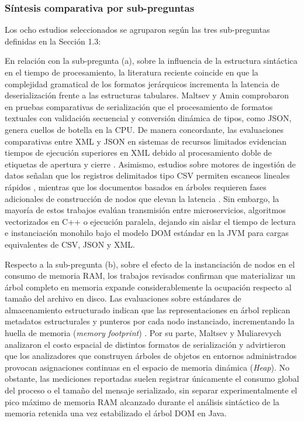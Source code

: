 \subsubsection{Síntesis comparativa por sub-preguntas}

Los ocho estudios seleccionados se agruparon según las tres sub-preguntas definidas en la Sección 1.3:

En relación con la sub-pregunta (a), sobre la influencia de la estructura sintáctica en el tiempo de procesamiento, la literatura reciente coincide en que la complejidad gramatical de los formatos jerárquicos incrementa la latencia de deserialización frente a las estructuras tabulares. Maltsev y Amin \cite{maltsev2024} comprobaron en pruebas comparativas de serialización que el procesamiento de formatos textuales con validación secuencial y conversión dinámica de tipos, como JSON, genera cuellos de botella en la CPU. De manera concordante, las evaluaciones comparativas entre XML y JSON en sistemas de recursos limitados evidencian tiempos de ejecución superiores en XML debido al procesamiento doble de etiquetas de apertura y cierre \cite{ieee_les_2024}. Asimismo, estudios sobre motores de ingestión de datos señalan que los registros delimitados tipo CSV permiten escaneos lineales rápidos \cite{langdale2019}, mientras que los documentos basados en árboles requieren fases adicionales de construcción de nodos que elevan la latencia \cite{ieee_icoailo_2025}. Sin embargo, la mayoría de estos trabajos evalúan transmisión entre microservicios, algoritmos vectorizados en C++ o ejecución paralela, dejando sin aislar el tiempo de lectura e instanciación monohilo bajo el modelo DOM estándar en la JVM para cargas equivalentes de CSV, JSON y XML.

Respecto a la sub-pregunta (b), sobre el efecto de la instanciación de nodos en el consumo de memoria RAM, los trabajos revisados confirman que materializar un árbol completo en memoria expande considerablemente la ocupación respecto al tamaño del archivo en disco. Las evaluaciones sobre estándares de almacenamiento estructurado indican que las representaciones en árbol replican metadatos estructurales y punteros por cada nodo instanciado, incrementando la huella de memoria (\textit{memory footprint}) \cite{ieee_les_2024}. Por su parte, Maltsev y Muliarevych \cite{maltsev2024b} analizaron el costo espacial de distintos formatos de serialización y advirtieron que los analizadores que construyen árboles de objetos en entornos administrados provocan asignaciones continuas en el espacio de memoria dinámica (\textit{Heap}). No obstante, las mediciones reportadas suelen registrar únicamente el consumo global del proceso o el tamaño del mensaje serializado, sin separar experimentalmente el pico máximo de memoria RAM alcanzado durante el análisis sintáctico de la memoria retenida una vez estabilizado el árbol DOM en Java.


